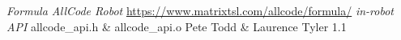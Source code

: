 \documentclass[11pt,a4paper,titlepage]{article}
\begin{document}
    \clearpage
    \begin{thebibliography}{5}
         \emph{Formula AllCode Robot}
            \url{https://www.matrixtsl.com/allcode/formula/}
         \emph{in-robot API}
            allcode\_api.h \& allcode\_api.o
            Pete Todd \& Laurence Tyler 1.1
    \end{thebibliography}
    \clearpage

    \label{thelastpage}
\end{document}
